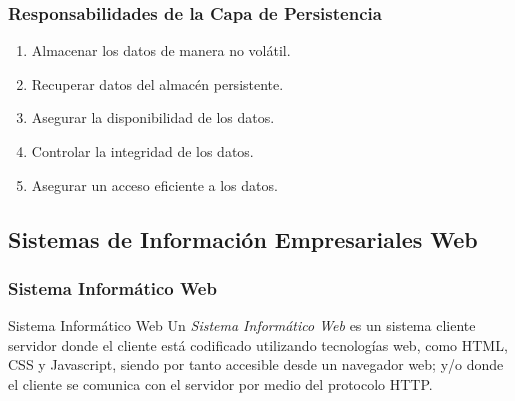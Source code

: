\documentclass[a4paper,t,xcolor=pst,dvips,colortheme]{beamer}
\begin{document}
\begin{frame}[c]
	\frametitle{Responsabilidades de la Capa de Persistencia}
	\begin{enumerate}[<+->]
        \item Almacenar los datos de manera no volátil.
        \item Recuperar datos del almacén persistente.
        \item Asegurar la disponibilidad de los datos.
        \item Controlar la integridad de los datos.
        \item Asegurar un acceso eficiente a los datos.
	\end{enumerate}
\end{frame}

\subsection[SIEs Web]{Sistemas de Información Empresariales Web}

\begin{frame}[c]
    \frametitle{Sistema Informático Web}
    \begin{block}{Sistema Informático Web}
        Un \emph{Sistema Informático Web} es un sistema cliente servidor donde el cliente está codificado utilizando tecnologías web, como HTML, CSS y Javascript, siendo por tanto accesible desde un navegador web; y/o donde el cliente se comunica con el servidor por medio del protocolo HTTP.
    \end{block}
\end{frame}
\end{document}
